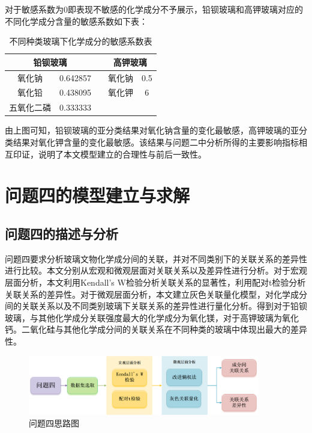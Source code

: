 \documentclass[withoutpreface,bwprint]{cumcmthesis} %
\begin{document}
对于敏感系数为0即表现不敏感的化学成分不予展示，铅钡玻璃和高钾玻璃对应的不同化学成分含量的敏感系数如下表：

\begin{table}[H]
  \centering
  \caption{不同种类玻璃下化学成分的敏感系数表}
  \begin{tabular}{cclcc}
    \toprule[1.5pt]
    \multicolumn{2}{c}{铅钡玻璃} &  & \multicolumn{2}{c}{高钾玻璃} \\ \hline
    氧化钠       & 0.642857     &  & 氧化钠         & 0.5        \\
    氧化铅       & 0.438095     &  & 氧化钾         & 6          \\
    五氧化二磷     & 0.333333     &  &             &            \\ \bottomrule[1.5pt]
  \end{tabular}
\end{table}

由上图可知，铅钡玻璃的亚分类结果对氧化钠含量的变化最敏感，高钾玻璃的亚分类结果对氧化钾含量的变化最敏感。该结果与问题二中分析所得的主要影响指标相互印证，说明了本文模型建立的合理性与前后一致性。

\section{问题四的模型建立与求解}

\subsection{问题四的描述与分析}

问题四要求分析玻璃文物化学成分间的关联，并对不同类别下的关联关系的差异性进行比较。本文分别从宏观和微观层面对关联关系以及差异性进行分析。对于宏观层面分析，本文利用Kendall's W检验分析关联关系的显著性，利用配对t检验分析关联关系的差异性。对于微观层面分析，本文建立灰色关联量化模型，对化学成分间的关联关系以及不同类别玻璃下关联关系的差异性进行量化分析。得到对于铅钡玻璃，与其他化学成分关联强度最大的化学成分为氧化镁，对于高钾玻璃为氧化钙。二氧化硅与其他化学成分间的关联关系在不同种类的玻璃中体现出最大的差异性。

\begin{figure}[H]
\centering
\includegraphics[width=0.9\textwidth]{figure/问题四}
\caption{问题四思路图}
\end{figure}
\end{document}
